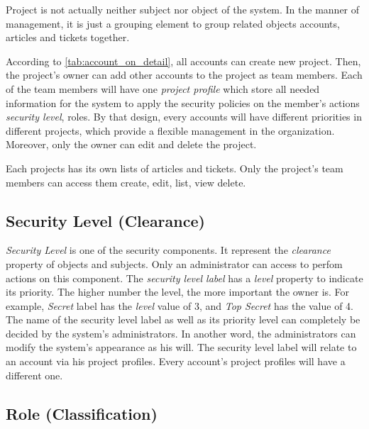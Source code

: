 Project is not actually neither subject nor object of the system.
In the manner of management, it is just a grouping element to group related objects \eg accounts, articles and tickets together.

According to \autoref{tab:account_on_detail}, all accounts can create new project.
Then, the project's owner can add other accounts to the project as team members.
Each of the team members will have one \emph{project profile} which store all needed information for the system to apply the security policies on the member's actions \eg \emph{security level}, roles.
By that design, every accounts will have different priorities in different projects, which provide a flexible management in the organization.
Moreover, only the owner can edit and delete the project.

Each projects has its own lists of articles and tickets.
Only the project's team members can access them \eg create, edit, list, view delete.


\subsection{Security Level (Clearance)}
\label{ch:hopot_project:project_components:security_level}

\emph{Security Level} is one of the security components.
It represent the \emph{clearance} property of objects and subjects.
Only an administrator can access to perfom actions on this component.
The \emph{security level label} has a \emph{level} property to indicate its priority.
The higher number the level, the more important the owner is.
For example, \emph{Secret} label has the \emph{level} value of 3, and \emph{Top Secret} has the value of 4.
The name of the security level label as well as its priority level can completely be decided by the system's administrators.
In another word, the administrators can modify the system's appearance as his will. 
The security level label will relate to an account via his project profiles. Every account's project profiles will have a different one.


\subsection{Role (Classification)}
\label{ch:hopot_project:role}

